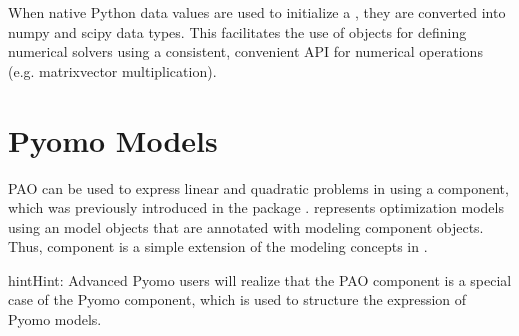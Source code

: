 \documentclass[letterpaper,10pt,english]{sphinxmanual}
\begin{document}
\begin{sphinxVerbatim}[commandchars=\\\{\}]
   
     

\PYG{p}{[}\PYG{p}{]}
\PYG{p}{[}\PYG{p}{]}
\end{sphinxVerbatim}

When native Python data values are used to initialize a
, they are converted into numpy and scipy
data types.  This facilitates the use of 
objects for defining numerical solvers using a consistent, convenient
API for numerical operations (e.g. matrix\sphinxhyphen{}vector multiplication).


\section{Pyomo Models}
\label{\detokenize{representations/pyomo:pyomo-models}}\label{\detokenize{representations/pyomo::doc}}
PAO can be used to express linear and quadratic problems in  using a {\hyperref[\detokenize{reference/pyomo:pao.pyomo.components.SubModel}]{}}
component, which was previously introduced in the 
package .  
represents optimization models using an model objects that are
annotated with modeling component objects.  Thus, {\hyperref[\detokenize{reference/pyomo:pao.pyomo.components.SubModel}]{}}
component is a simple extension of the modeling concepts in .

\begin{sphinxadmonition}{hint}{Hint:}
Advanced Pyomo users will realize that the PAO {\hyperref[\detokenize{reference/pyomo:pao.pyomo.components.SubModel}]{}} component
is a special case of the Pyomo  component, which is used to
structure the expression of Pyomo models.
\end{sphinxadmonition}
\end{document}
